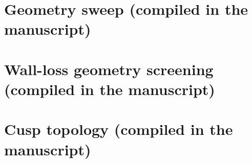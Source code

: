 \documentclass[11pt]{article}
\begin{document}
\section{Geometry sweep (compiled in the manuscript)}\label{sec:l1a-sweep-v2}
\section{Wall-loss geometry screening (compiled in the manuscript)}\label{sec:wall-loss-geometry-screening}
\section{Cusp topology (compiled in the manuscript)}\label{sec:cusp-topology}

\end{document}

